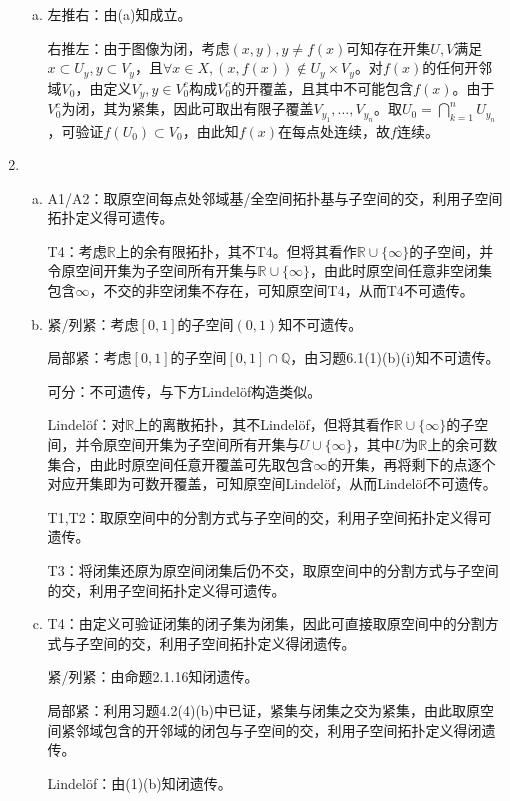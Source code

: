 \documentclass[a4paper,UTF8,fontset=windows]{ctexart}
\begin{document}
\begin{enumerate}[(1)]
\begin{enumerate}[(a)]
    \item
    左推右：由(a)知成立。
    
    右推左：由于图像为闭，考虑$(x,y),y\ne f(x)$可知存在开集$U,V$满足$x\subset U_y,y\subset V_y$，且$\forall x\in X,(x,f(x))\notin U_y\times V_y$。对$f(x)$的任何开邻域$V_0$，由定义$V_y,y\in V_0^c$构成$V_0^c$的开覆盖，且其中不可能包含$f(x)$。由于$V_0^c$为闭，其为紧集，因此可取出有限子覆盖$V_{y_1},\dots,V_{y_n}$。取$U_0=\bigcap_{k=1}^nU_{y_n}$，可验证$f(U_0)\subset V_0$，由此知$f(x)$在每点处连续，故$f$连续。
    \end{enumerate}
    
    \item
    \begin{enumerate}[(a)]
    \item
    A1/A2：取原空间每点处邻域基/全空间拓扑基与子空间的交，利用子空间拓扑定义得可遗传。
    
    T4：考虑$\mathbb{R}$上的余有限拓扑，其不T4。但将其看作$\mathbb{R}\cup\{\infty\}$的子空间，并令原空间开集为子空间所有开集与$\mathbb{R}\cup\{\infty\}$，由此时原空间任意非空闭集包含$\infty$，不交的非空闭集不存在，可知原空间T4，从而T4不可遗传。
    
    \item
    紧/列紧：考虑$[0,1]$的子空间$(0,1)$知不可遗传。
    
    局部紧：考虑$[0,1]$的子空间$[0,1]\cap\mathbb{Q}$，由习题6.1(1)(b)(i)知不可遗传。
    
    可分：不可遗传，与下方Lindel\"of构造类似。
    
    Lindel\"of：对$\mathbb{R}$上的离散拓扑，其不Lindel\"of，但将其看作$\mathbb{R}\cup\{\infty\}$的子空间，并令原空间开集为子空间所有开集与$U\cup\{\infty\}$，其中$U$为$\mathbb{R}$上的余可数集合，由此时原空间任意开覆盖可先取包含$\infty$的开集，再将剩下的点逐个对应开集即为可数开覆盖，可知原空间Lindel\"of，从而Lindel\"of不可遗传。
    
    T1,T2：取原空间中的分割方式与子空间的交，利用子空间拓扑定义得可遗传。
    
    T3：将闭集还原为原空间闭集后仍不交，取原空间中的分割方式与子空间的交，利用子空间拓扑定义得可遗传。
    
    \item
    T4：由定义可验证闭集的闭子集为闭集，因此可直接取原空间中的分割方式与子空间的交，利用子空间拓扑定义得闭遗传。
    
    紧/列紧：由命题2.1.16知闭遗传。
    
    局部紧：利用习题4.2(4)(b)中已证，紧集与闭集之交为紧集，由此取原空间紧邻域包含的开邻域的闭包与子空间的交，利用子空间拓扑定义得闭遗传。
    
    Lindel\"of：由(1)(b)知闭遗传。
    \end{enumerate}
\end{enumerate}
\end{document}
